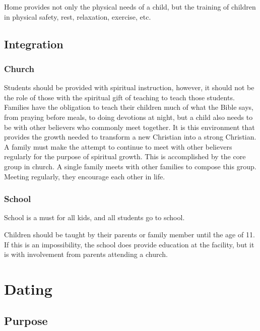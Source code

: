 \documentclass[CSHFoundation.tex]{subfiles}
\begin{document}
Home provides not only the physical needs of a child, but the training of children in physical safety, rest, relaxation, exercise, etc.



\subsection{Integration}



\subsubsection{Church}



Students should be provided with spiritual instruction, however, it should not be the role of those with the spiritual gift of teaching to teach those students. Families have the obligation to teach their children much of what the Bible says, from praying before meals, to doing devotions at night, but a child also needs to be with other believers who commonly meet together. It is this environment that provides the growth needed to transform a new Christian into a strong Christian. A family must make the attempt to continue to meet with other believers regularly for the purpose of spiritual growth. This is accomplished by the core group in church. A single family meets with other families to compose this group. Meeting regularly, they encourage each other in life.



\subsubsection{School}



School is a must for all kids, and all students go to school.



Children should be taught by their parents or family member until the age of 11. If this is an impossibility, the school does provide education at the facility, but it is with involvement from parents attending a church.

\section{Dating}


\subsection{Purpose}
\end{document}
